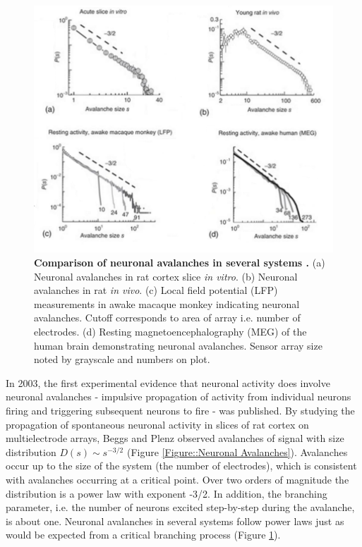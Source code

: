 \documentclass[12pt]{article}
\begin{document}
\begin{figure}   
  \begin{center}    
 \includegraphics[width=1\textwidth]{avalanchesplenzbook3}    
    \caption{\textbf{Comparison of neuronal avalanches in several systems \cite{Plenz2014}.} (a) Neuronal avalanches in rat cortex slice \textit{in vitro}. (b) Neuronal avalanches in rat \textit{in vivo}. (c) Local field potential (LFP) measurements in awake macaque monkey indicating neuronal avalanches. Cutoff corresponds to area of array i.e. number of electrodes. (d) Resting magnetoencephalography (MEG) of the human brain demonstrating neuronal avalanches. Sensor array size noted by grayscale and numbers on plot.}
   \label{Figure::Neuronal avalanches in vitro and in vivo}   
  \end{center}     
   \end{figure}
   
In 2003, the first experimental evidence that neuronal activity does involve neuronal avalanches - impulsive propagation of activity from individual neurons firing and triggering subsequent neurons to fire - was published\cite{Beggs2003b}. By studying the propagation of spontaneous neuronal activity in slices of rat cortex on multielectrode arrays, Beggs and Plenz observed avalanches of signal with size distribution $ D(s) \sim s^{-3/2} $ (Figure \ref{Figure::Neuronal Avalanches}). Avalanches occur up to the size of the system (the number of electrodes), which is consistent with avalanches occurring at a critical point. Over two orders of magnitude the distribution is a power law with exponent -3/2. In addition, the branching parameter, i.e. the number of neurons excited step-by-step during the avalanche, is about one. Neuronal avalanches in several systems follow power laws just as would be expected from a critical branching process (Figure \ref{Figure::Neuronal avalanches in vitro and in vivo}).
  
\end{document}
